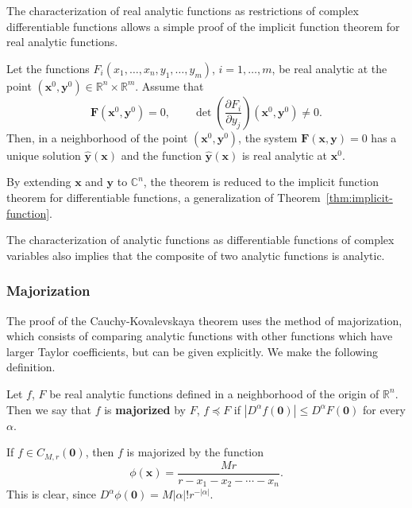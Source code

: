 The characterization of real analytic functions as restrictions of complex differentiable functions allows a simple proof of the implicit function theorem for real analytic functions.

\begin{Theorem}
\label{thm:real-analytic-implicit-function}
Let the functions $F_i(x_1,\ldots,x_n,y_1,\ldots,y_m)$, $i=1,\ldots,m$, be real analytic at the point $(\bm{x}^0,\bm{y}^0)\in\mathbb{R}^n\times\mathbb{R}^m$. Assume that
\begin{equation}\label{eq:analytic-implicit-function-hypothesis}
\bm{F}(\bm{x}^0,\bm{y}^0)=0,\qquad\det\left(\dfrac{\partial F_i}{\partial y_j}\right)(\bm{x}^0,\bm{y}^0)\ne0.
\end{equation}
Then, in a neighborhood of the point $(\bm{x}^0,\bm{y}^0)$, the system $\bm{F}(\bm{x},\bm{y})=0$ has a unique solution $\hat{\bm{y}}(\bm{x})$ and the function $\hat{\bm{y}}(\bm{x})$ is real analytic at $\bm{x}^0$.
\end{Theorem}

By extending $\bm{x}$ and $\bm{y}$ to $\mathbb{C}^n$, the theorem is reduced to the implicit function theorem for differentiable functions, a generalization of Theorem~\ref{thm:implicit-function}.

The characterization of analytic functions as differentiable functions of complex variables also implies that the composite of two analytic functions is analytic.

\subsubsection{Majorization}\label{subsec:majorization}

The proof of the Cauchy-Kovalevskaya theorem uses the method of majorization, which consists of comparing analytic functions with other functions which have larger Taylor coefficients, but can be given explicitly. We make the following definition.

\begin{Definition}
\label{def:analytic-majorization}
Let $f$, $F$ be real analytic functions defined in a neighborhood of the origin of $\mathbb{R}^n$. Then we say that $f$ is \textbf{majorized} by $F$, $f\preceq F$ if $|D^\alpha f(\bm{0})|\leq D^\alpha F(\bm{0})$ for every $\alpha$.
\end{Definition}

\begin{Example}
\label{ex:rational-analytic-majorant}
If $f\in C_{M,r}(\bm{0})$, then $f$ is majorized by the function
\begin{equation}\label{eq:analytic-rational-majorant}
\phi(\bm{x})=\dfrac{Mr}{r-x_1-x_2-\cdots-x_n}.
\end{equation}
This is clear, since $D^\alpha\phi(\bm{0})=M|\alpha|!r^{-|\alpha|}$.
\end{Example}

